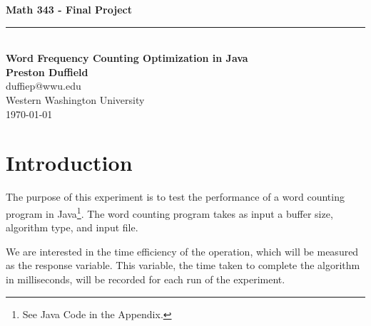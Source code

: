 \documentclass{article}
\begin{document}
\noindent

\begin{center}
    \vspace*{0.3\textheight}
    {\fontsize{80}{18}\textbf{Math 343 - Final Project}}\\
    \vspace{6pt} %
    \rule{0.87\linewidth}{1pt}\\ %
    \vspace{12pt} %
    \LARGE\textbf{Word Frequency Counting Optimization in Java}\\
    
    \vspace{12pt}
    \Large\textbf{Preston Duffield} \\
    \Large duffiep@wwu.edu \\
    \Large Western Washington University \\
    \today
    \vspace{24pt}
\end{center}



\clearpage
\section*{Introduction}
The purpose of this experiment is to test the performance of a
word counting program in Java\footnote{See Java Code in the Appendix.}.
The word counting program takes as input a buffer size, algorithm type, and input file.

We are interested in the time efficiency of the operation, which will be measured as the
response variable. This variable, the time taken to complete the algorithm
in milliseconds, will be recorded for each run of the experiment.
\end{document}

